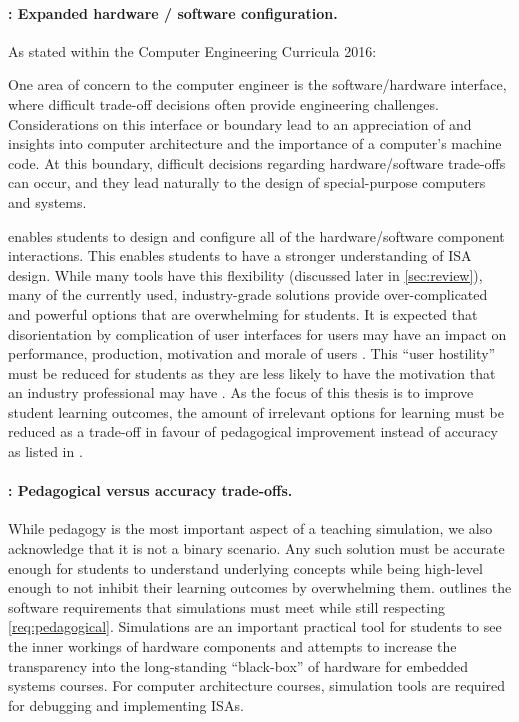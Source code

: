 \paragraph{: Expanded hardware / software configuration.} As stated within the Computer Engineering Curricula 2016:
\begin{displayquote}
    One area of concern to the computer engineer is the software/hardware interface, where difficult trade-off decisions often provide engineering challenges. Considerations on this interface or boundary lead to an    appreciation of and insights into computer architecture and the importance of a computer’s machine code. At this boundary, difficult decisions regarding hardware/software trade-offs can occur, and they lead naturally to the design of special-purpose computers and systems.
\end{displayquote}
\noindent {} enables students to design and configure all of the hardware/software component interactions. This enables students to have a stronger understanding of ISA design. While many tools have this flexibility (discussed later in \cref{sec:review}), many of the currently used, industry-grade solutions provide over-complicated and powerful options that are overwhelming for students. It is expected that disorientation by complication of user interfaces for users may have an impact on performance, production, motivation and morale of users \cite{Chalmers2003}. This ``user hostility'' must be reduced for students as they are less likely to have the motivation that an industry professional may have \cite{Djordjevic2005}. As the focus of this thesis is to improve student learning outcomes, the amount of irrelevant options for learning must be reduced as a trade-off in favour of pedagogical improvement instead of accuracy as listed in .

\paragraph{: Pedagogical versus accuracy trade-offs.} While pedagogy is the most important aspect of a teaching simulation, we also acknowledge that it is not a binary scenario. Any such solution must be accurate enough for students to understand underlying concepts while being high-level enough to not inhibit their learning outcomes by overwhelming them.  outlines the software requirements that simulations must meet while still respecting \cref{req:pedagogical}. Simulations are an important practical tool for students to see the inner workings of hardware components and attempts to increase the transparency into the long-standing ``black-box'' of hardware for embedded systems courses. For computer architecture courses, simulation tools are required for debugging and implementing ISAs. 

